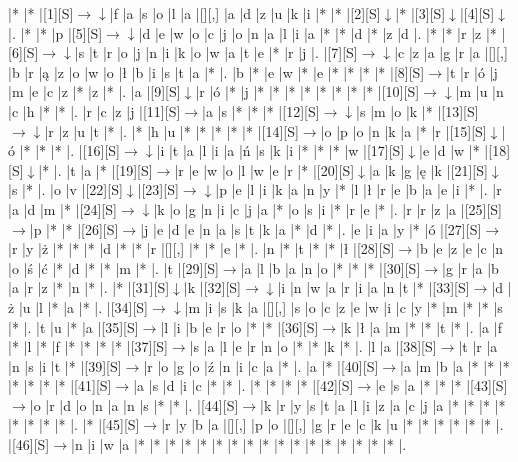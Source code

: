 \documentclass[11pt]{article}
\newcommand\drarr{$\rightarrow \!\!\!\!\! \downarrow$}
\newcommand\rarr{$\rightarrow$}
\newcommand\darr{$\downarrow$}
\begin{document}
\noindent\begin{Puzzle}{21}{25}|*	|*	|[1][S]\drarr	|f	|a	|s	|o	|l	|a	|[][,]{ }	|a	|d	|z	|u	|k	|i	|*	|*	|[2][S]\darr	|*	|[3][S]\darr	|[4][S]\darr	|.
|*	|*	|p	|[5][S]\drarr	|d	|e	|w	|o	|c	|j	|o	|n	|a	|l	|i	|a	|*	|*	|d	|*	|z	|d	|.
|*	|*	|r	|z	|*	|[6][S]\drarr	|s	|t	|r	|o	|j	|n	|i	|k	|o	|w	|a	|t	|e	|*	|r	|j	|.
|[7][S]\drarr	|c	|z	|a	|g	|r	|a	|[][,]{ }	|b	|r	|ą	|z	|o	|w	|o	|ł	|b	|i	|s	|t	|a	|*	|.
|b	|*	|e	|w	|*	|e	|*	|*	|*	|*	|[8][S]\rarr	|t	|r	|ó	|j	|m	|e	|c	|z	|*	|z	|*	|.
|a	|[9][S]\darr	|r	|ó	|*	|j	|*	|*	|*	|*	|*	|*	|*	|*	|[10][S]\drarr	|m	|u	|n	|c	|h	|*	|*	|.
|r	|c	|z	|j	|[11][S]\rarr	|a	|s	|*	|*	|*	|[12][S]\drarr	|s	|m	|o	|k	|*	|[13][S]\drarr	|r	|z	|u	|t	|*	|.
|*	|h	|u	|*	|*	|*	|*	|*	|[14][S]\rarr	|o	|p	|o	|n	|k	|a	|*	|r	|[15][S]\darr	|ó	|*	|*	|*	|.
|[16][S]\drarr	|i	|t	|a	|l	|i	|a	|ń	|s	|k	|i	|*	|*	|*	|w	|[17][S]\darr	|e	|d	|w	|*	|[18][S]\darr	|*	|.
|t	|a	|*	|[19][S]\rarr	|r	|e	|w	|o	|l	|w	|e	|r	|*	|[20][S]\darr	|a	|k	|g	|ę	|k	|[21][S]\darr	|s	|*	|.
|o	|v	|[22][S]\darr	|[23][S]\drarr	|p	|e	|l	|i	|k	|a	|n	|y	|*	|l	|ł	|r	|e	|b	|a	|e	|i	|*	|.
|r	|a	|d	|m	|*	|[24][S]\drarr	|k	|o	|g	|n	|i	|c	|j	|a	|*	|o	|s	|i	|*	|r	|e	|*	|.
|r	|r	|z	|a	|[25][S]\rarr	|p	|*	|*	|[26][S]\rarr	|j	|e	|d	|e	|n	|a	|s	|t	|k	|a	|*	|d	|*	|.
|e	|i	|a	|y	|*	|ó	|[27][S]\rarr	|r	|y	|ż	|*	|*	|*	|d	|*	|*	|r	|[][,]{ }	|*	|*	|e	|*	|.
|n	|*	|t	|*	|*	|ł	|[28][S]\rarr	|b	|e	|z	|e	|c	|n	|o	|ś	|ć	|*	|d	|*	|*	|m	|*	|.
|t	|[29][S]\rarr	|a	|l	|b	|a	|n	|o	|*	|*	|*	|[30][S]\rarr	|g	|r	|a	|b	|a	|r	|z	|*	|n	|*	|.
|*	|[31][S]\darr	|k	|[32][S]\drarr	|i	|n	|w	|a	|r	|i	|a	|n	|t	|*	|[33][S]\rarr	|d	|ż	|u	|l	|*	|a	|*	|.
|[34][S]\drarr	|m	|i	|s	|k	|a	|[][,]{ }	|s	|o	|c	|z	|e	|w	|i	|c	|y	|*	|m	|*	|*	|s	|*	|.
|t	|u	|*	|a	|[35][S]\rarr	|l	|i	|b	|e	|r	|o	|*	|*	|[36][S]\rarr	|k	|ł	|a	|m	|*	|*	|t	|*	|.
|a	|f	|*	|l	|*	|f	|*	|*	|*	|*	|[37][S]\rarr	|s	|a	|l	|e	|r	|n	|o	|*	|*	|k	|*	|.
|l	|a	|[38][S]\rarr	|t	|r	|a	|n	|s	|i	|t	|*	|[39][S]\rarr	|r	|o	|g	|o	|ź	|n	|i	|c	|a	|*	|.
|a	|*	|[40][S]\rarr	|a	|m	|b	|a	|*	|*	|*	|*	|*	|*	|*	|[41][S]\rarr	|a	|s	|d	|i	|c	|*	|*	|.
|*	|*	|*	|*	|[42][S]\rarr	|e	|s	|a	|*	|*	|*	|[43][S]\rarr	|o	|r	|d	|o	|n	|a	|n	|s	|*	|*	|.
|[44][S]\rarr	|k	|r	|y	|s	|t	|a	|l	|i	|z	|a	|c	|j	|a	|*	|*	|*	|*	|*	|*	|*	|*	|.
|*	|[45][S]\rarr	|r	|y	|b	|a	|[][,]{ }	|p	|o	|[][,]{ }	|g	|r	|e	|c	|k	|u	|*	|*	|*	|*	|*	|*	|.
|[46][S]\rarr	|n	|i	|w	|a	|*	|*	|*	|*	|*	|*	|*	|*	|*	|*	|*	|*	|*	|*	|*	|*	|*	|.\end{Puzzle}

\newpage
\end{document}
